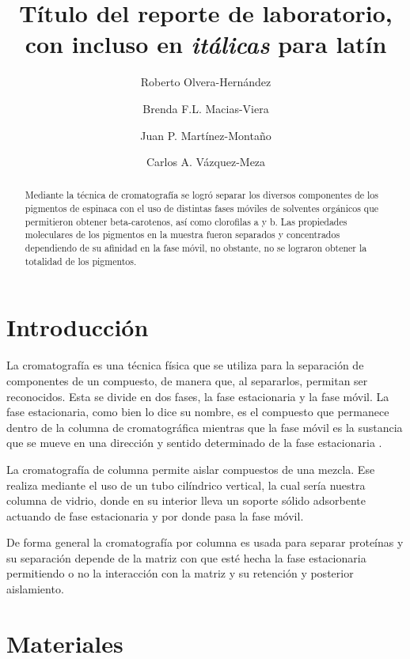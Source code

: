 \documentclass{ITESO-Project}
\title{Título del reporte de laboratorio, con incluso en \textit{itálicas} para latín}
\author[a]{Roberto Olvera-Hernández} %
\author[a]{Brenda F.L. Macias-Viera}
\author[a]{Juan P. Martínez-Montaño}
\author[a]{Carlos A. Vázquez-Meza}
\date{} %
\affil[a]{Ingeniería en biotecnología, \itesoinfo}
\begin{document}
\maketitle %
    \nocite{*} %
    {\small \tableofcontents} %
    \thispagestyle{firstpage} %

\begin{abstract}\label{abstract}
    Mediante la técnica de cromatografía se logró separar los diversos componentes de los pigmentos de espinaca con el uso de distintas fases móviles de solventes orgánicos que permitieron obtener beta-carotenos, así como clorofilas a y b. Las propiedades moleculares de los pigmentos en la muestra fueron separados y concentrados dependiendo de su afinidad en la fase móvil, no obstante, no se lograron obtener la totalidad de los pigmentos.
\end{abstract}

\newpage

\section{Introducción}\label{intro}

La cromatografía es una técnica física que se utiliza para la separación de componentes de un compuesto, de manera que, al separarlos, permitan ser reconocidos. Esta se divide en dos fases, la fase estacionaria y la fase móvil. La fase estacionaria, como bien lo dice su nombre, es el compuesto que permanece dentro de la columna de cromatográfica mientras que la fase móvil es la sustancia que se mueve en una dirección y sentido determinado de la fase estacionaria \parencite{Sgariglia2010}. 

La cromatografía de columna permite aislar compuestos de una mezcla. Ese realiza mediante el uso de un tubo cilíndrico vertical, la cual sería nuestra columna de vidrio, donde en su interior lleva un soporte sólido adsorbente actuando de fase estacionaria y por donde pasa la fase móvil.

De forma general la cromatografía por columna es usada para separar proteínas y su separación depende de la matriz con que esté hecha la fase estacionaria permitiendo o no la interacción con la matriz y su retención y posterior aislamiento.

\section{Materiales}\label{materiales}
\end{document}
